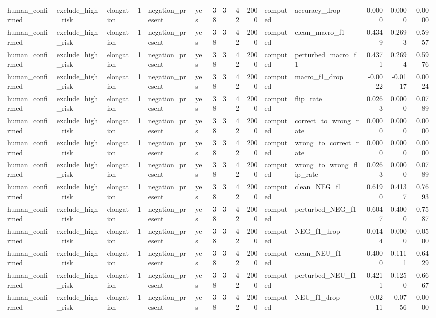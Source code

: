 \begin{tabular}{lllrllrrrrllrrr}
human_confirmed & exclude_high_risk & elongation & 1 & negation_present & yes & 38 & 3 & 42 & 2000 & computed & accuracy_drop & 0.0000 & 0.0000 & 0.0000 \\
human_confirmed & exclude_high_risk & elongation & 1 & negation_present & yes & 38 & 3 & 42 & 2000 & computed & clean_macro_f1 & 0.4349 & 0.2693 & 0.5957 \\
human_confirmed & exclude_high_risk & elongation & 1 & negation_present & yes & 38 & 3 & 42 & 2000 & computed & perturbed_macro_f1 & 0.4371 & 0.2694 & 0.5976 \\
human_confirmed & exclude_high_risk & elongation & 1 & negation_present & yes & 38 & 3 & 42 & 2000 & computed & macro_f1_drop & -0.0022 & -0.0117 & 0.0024 \\
human_confirmed & exclude_high_risk & elongation & 1 & negation_present & yes & 38 & 3 & 42 & 2000 & computed & flip_rate & 0.0263 & 0.0000 & 0.0789 \\
human_confirmed & exclude_high_risk & elongation & 1 & negation_present & yes & 38 & 3 & 42 & 2000 & computed & correct_to_wrong_rate & 0.0000 & 0.0000 & 0.0000 \\
human_confirmed & exclude_high_risk & elongation & 1 & negation_present & yes & 38 & 3 & 42 & 2000 & computed & wrong_to_correct_rate & 0.0000 & 0.0000 & 0.0000 \\
human_confirmed & exclude_high_risk & elongation & 1 & negation_present & yes & 38 & 3 & 42 & 2000 & computed & wrong_to_wrong_flip_rate & 0.0263 & 0.0000 & 0.0789 \\
human_confirmed & exclude_high_risk & elongation & 1 & negation_present & yes & 38 & 3 & 42 & 2000 & computed & clean_NEG_f1 & 0.6190 & 0.4137 & 0.7693 \\
human_confirmed & exclude_high_risk & elongation & 1 & negation_present & yes & 38 & 3 & 42 & 2000 & computed & perturbed_NEG_f1 & 0.6047 & 0.4000 & 0.7587 \\
human_confirmed & exclude_high_risk & elongation & 1 & negation_present & yes & 38 & 3 & 42 & 2000 & computed & NEG_f1_drop & 0.0144 & 0.0000 & 0.0500 \\
human_confirmed & exclude_high_risk & elongation & 1 & negation_present & yes & 38 & 3 & 42 & 2000 & computed & clean_NEU_f1 & 0.4000 & 0.1111 & 0.6429 \\
human_confirmed & exclude_high_risk & elongation & 1 & negation_present & yes & 38 & 3 & 42 & 2000 & computed & perturbed_NEU_f1 & 0.4211 & 0.1250 & 0.6667 \\
human_confirmed & exclude_high_risk & elongation & 1 & negation_present & yes & 38 & 3 & 42 & 2000 & computed & NEU_f1_drop & -0.0211 & -0.0756 & 0.0000 \\

\end{tabular}
